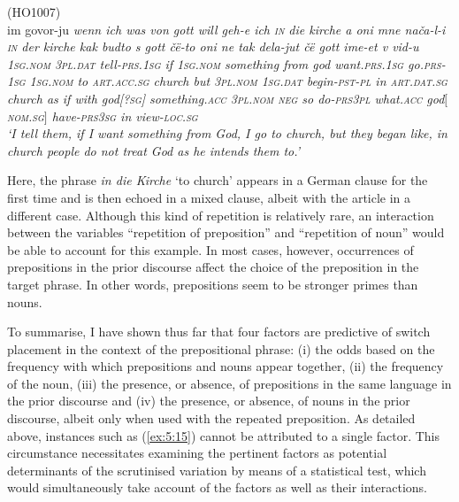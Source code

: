 \ea
\label{ex5.16}
(HO1007)\\
 {im} {govor-ju} \itshape{wenn} \itshape{ich} \itshape{was} \itshape{von} \itshape{gott} \itshape{will} \itshape{geh-e} \itshape{ich} \itshape{\textsc{in}} \itshape{die} \itshape{kirche} {a} {oni} {mne} {nača-l-i} \itshape{\textsc{in}} \itshape{der} \itshape{kirche} {kak} {budto} {s} \textit{gott} {čë-to} {oni} {ne} {tak} {dela-jut} {čë} \textit{gott} {ime-et} {v} {vid-u}\\
	{\textsc{1sg.nom}} \textsc{3pl.dat} tell-\textsc{prs.1sg} if \textsc{1sg.nom} something from god want.\textsc{prs.1sg} go.\textsc{prs-1sg} \textsc{1sg.nom} to \textsc{art.acc.sg} church but \textsc{3pl.nom} \textsc{1sg.dat} begin-\textsc{pst-pl} in \textsc{art.dat.sg} church as if with god[\textsc{?sg}] something.\textsc{acc} \textsc{3pl.nom} \textsc{neg} so do-\textsc{prs3pl} what.\textsc{acc} god$[$\textsc{nom.sg}$]$ have-\textsc{prs3sg} in view-\textsc{loc.sg}\\
\glt `I tell them, if I want something from God, I go to church, but they began like, in church people do not treat God as he intends them to.'
\z

\noindent Here, the phrase \textit{in die Kirche} `to church' appears in a German clause for the first time and is then echoed in a mixed clause, albeit with the article in a different case. Although this kind of repetition is relatively rare, an interaction between the variables “repetition of preposition” and “repetition of noun” would be able to account for this example. In most cases, however, occurrences of prepositions in the prior discourse affect the choice of the preposition in the target phrase. In other words, prepositions seem to be stronger primes than nouns.

To summarise, I have shown thus far that four factors are predictive of switch placement in the context of the prepositional phrase: (i) the odds based on the frequency with which prepositions and nouns appear together, (ii) the frequency of the noun, (iii) the presence, or absence, of prepositions in the same language in the prior discourse and (iv) the presence, or absence, of nouns in the prior discourse, albeit only when used with the repeated preposition. As detailed above, instances such as (\ref{ex:5:15}) cannot be attributed to a single factor. This circumstance necessitates examining the pertinent factors as potential determinants of the scrutinised variation by means of a statistical test, which would simultaneously take account of the factors as well as their interactions.

